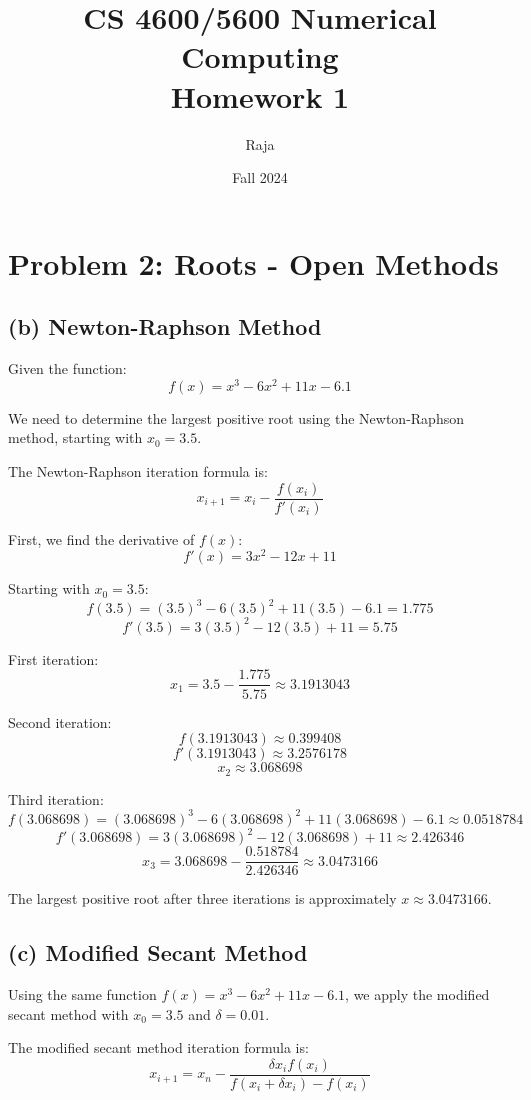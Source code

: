 \documentclass[12pt]{article}
\title{CS 4600/5600 Numerical Computing\\ Homework 1}
\author{Raja}
\date{Fall 2024}
\begin{document}
\maketitle

\section*{Problem 2: Roots - Open Methods}

\subsection*{(b) Newton-Raphson Method}

Given the function:
\[
f(x) = x^3 - 6x^2 + 11x - 6.1
\]

We need to determine the largest positive root using the Newton-Raphson method, starting with \(x_0 = 3.5\).

The Newton-Raphson iteration formula is:
\[
x_{i+1} = x_i - \frac{f(x_i)}{f'(x_i)}
\]

First, we find the derivative of \(f(x)\):
\[
f'(x) = 3x^2 - 12x + 11
\]

Starting with \(x_0 = 3.5\):
\[
f(3.5) = (3.5)^3 - 6(3.5)^2 + 11(3.5) - 6.1 = 1.775
\]
\[
f'(3.5) = 3(3.5)^2 - 12(3.5) + 11 = 5.75
\]

First iteration:
\[
x_1 = 3.5 - \frac{1.775}{5.75} \approx 3.1913043
\]

Second iteration:
\[
f(3.1913043)  \approx 0.399408
\]
\[
f'(3.1913043)  \approx 3.2576178
\]
\[
x_2 \approx 3.068698
\]

Third iteration:
\[
f(3.068698) = (3.068698)^3 - 6(3.068698)^2 + 11(3.068698) - 6.1 \approx 0.0518784
\]
\[
f'(3.068698) = 3(3.068698)^2 - 12(3.068698) + 11 \approx 2.426346
\]
\[
x_3 = 3.068698 - \frac{0.518784}{2.426346} \approx 3.0473166
\]

The largest positive root after three iterations is approximately \(x \approx 3.0473166\).

\subsection*{(c) Modified Secant Method}

Using the same function \(f(x) = x^3 - 6x^2 + 11x - 6.1\), we apply the modified secant method with \(x_0 = 3.5\) and \(\delta = 0.01\).

The modified secant method iteration formula is:
\[
x_{i+1} = x_n - \frac{\delta x_i f(x_i)}{f(x_i + \delta x_i) - f(x_i)}
\]
\end{document}
